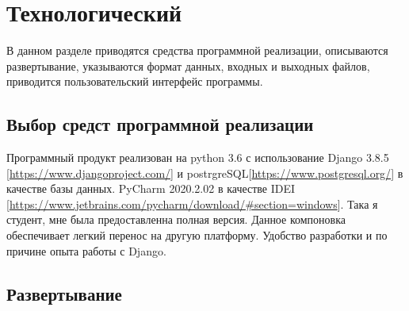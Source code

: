 \newpage
\section{Технологический}
В данном разделе приводятся средства программной реализации, описываются развертывание, указываются формат данных, входных и выходных файлов, приводится пользовательский интерфейс
программы.

\subsection{Выбор средст программной реализации}
	
	Программный продукт реализован на python 3.6 с использование Django 3.8.5 [\url{https://www.djangoproject.com/}] и postrgreSQL[\url{https://www.postgresql.org/}] в качестве базы данных. PyCharm 2020.2.02 в качестве IDEI [\url{https://www.jetbrains.com/pycharm/download/#section=windows}]. Така я студент, мне была предоставленна полная версия.
	Данное компоновка обеспечивает легкий перенос на другую платформу. Удобство разработки и по причине опыта работы с Django.
	
\subsection{Развертывание}

